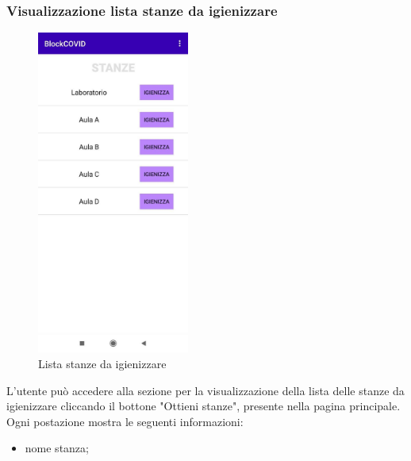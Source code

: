	\subsubsection{Visualizzazione lista stanze da igienizzare}
	\begin{figure}[H]
		\centering
		\includegraphics[width=5cm]{res/images/stanzeDaIgienizzareAddetto.png}
		\caption{Lista stanze da igienizzare}
	\end{figure}
	L’utente può accedere alla sezione per la visualizzazione della lista delle stanze da igienizzare cliccando il bottone "Ottieni stanze", presente nella pagina principale.
	Ogni postazione mostra le seguenti informazioni:
	\begin{itemize}
		\item nome stanza;
	\end{itemize}
	
